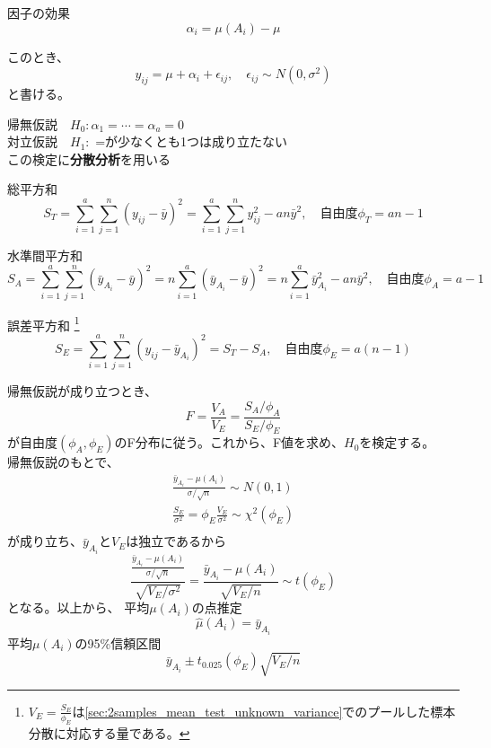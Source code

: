 因子の効果 
\begin{equation}
  \alpha_i = \mu (A_i) - \mu
\end{equation}

このとき、 
\begin{equation}
  y_{ij} = \mu + \alpha_i + \epsilon_{ij}, \quad \epsilon_{ij} \sim N(0, \sigma^2)
\end{equation}
と書ける。

帰無仮説　\(H_0: \alpha_1 = \cdots = \alpha_a = 0\)\\
対立仮説　\(H_1:\) =が少なくとも1つは成り立たない\\
この検定に\textbf{分散分析}を用いる

総平方和 \begin{equation}{
    S_T = \sum_{i =1}^{a} \sum_{j=1}^{n} (y_{ij}- \bar{y})^2 
    = \sum_{i =1}^{a} \sum_{j=1}^{n} y_{ij}^{2} - an \bar{y}^{2}, \quad 自由度 \phi_T = an -1
  }\end{equation}

水準間平方和 \begin{equation}{
    S_A = \sum_{i =1}^{a} \sum_{j=1}^{n} (\bar{y}_{A_i}- \bar{y})^2 
    = n \sum_{i =1}^{a}  (\bar{y}_{A_i}- \bar{y})^2 
    = n \sum_{i =1}^{a} \bar{y}_{A_i}^{2} - an \bar{y}^{2} , \quad 自由度 \phi_A = a -1
  }\end{equation}

誤差平方和
\footnote{\(V_{E} = \frac{S_{E}}{\phi_{E}}\)は\cref{sec:2samples_mean_test_unknown_variance}でのプールした標本分散に対応する量である。}
\begin{equation}{
    S_E = \sum_{i =1}^{a} \sum_{j=1}^{n} (y_{ij}- \bar{y}_{A_i})^2 = S_{T} - S_{A} , \quad 自由度 \phi_E = a (n-1)
  }\end{equation}

帰無仮説が成り立つとき、 \begin{equation}{
    F = \frac{V_A}{V_E} = \frac{S_A / \phi_A}{S_E / \phi_E}
  }\end{equation}
が自由度\((\phi_A,\phi_E)\)のF分布に従う。これから、F値を求め、\(H_0\)を検定する。\\
帰無仮説のもとで、
\begin{align}
  \frac{\bar{y}_{A_i} - \mu(A_i)}{\sigma / \sqrt{n}} \sim N(0, 1)                \\
  \frac{S_{E}}{\sigma^2} = \phi_{E} \frac{V_{E}}{\sigma^2} \sim \chi^2(\phi_{E}) \\
\end{align}
が成り立ち、\(\bar{y}_{A_i}\)と\(V_{E}\)は独立であるから
\begin{equation}
  \frac{\frac{\bar{y}_{A_i} - \mu(A_i)}{\sigma / \sqrt{n}}}{\sqrt{V_{E} / \sigma^2}}
  = \frac{\bar{y}_{A_i} - \mu(A_i)}{\sqrt{V_{E}/n}} \sim t(\phi_{E})
\end{equation}
となる。以上から、
平均\(\mu (A_i)\)の点推定 \begin{equation}{
    \hat{\mu} (A_i) = \bar{y}_{A_i}
  }\end{equation} 平均\(\mu (A_i)\)の95\%信頼区間 \begin{equation}{
    \bar{y}_{A_i} \pm t_{0.025} (\phi_E) \sqrt{V_E / n}
  }\end{equation}


